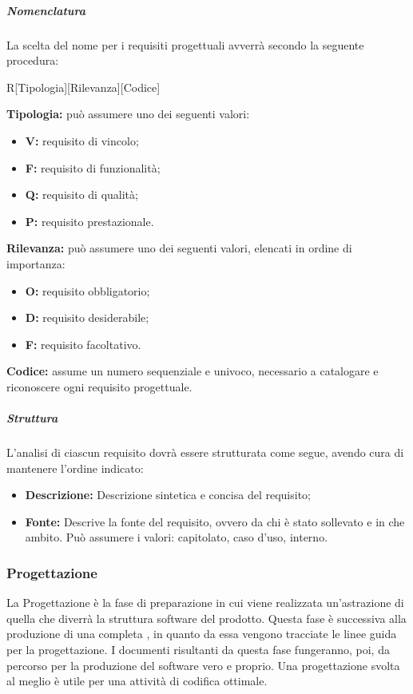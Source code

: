 			\subparagraph{Nomenclatura}
			La scelta del nome per i requisiti progettuali avverrà secondo la seguente procedura:
			\begin{center}
			R[Tipologia][Rilevanza][Codice]
			\end{center}
			\textbf{Tipologia:} può assumere uno dei seguenti valori:
			\begin{itemize}
				\item \textbf{V:} requisito di vincolo;
				\item \textbf{F:} requisito di funzionalità;
				\item \textbf{Q:} requisito di qualità;
				\item \textbf{P:} requisito prestazionale.
			\end{itemize}
			\textbf{Rilevanza:} può assumere uno dei seguenti valori, elencati in ordine di importanza:
			\begin{itemize}
				\item \textbf{O:} requisito obbligatorio;
				\item \textbf{D:} requisito desiderabile;
				\item \textbf{F:} requisito facoltativo.
			\end{itemize}
			\textbf{Codice:} assume un numero sequenziale e univoco, necessario a catalogare e riconoscere ogni requisito progettuale.
		
			\subparagraph{Struttura}
			L'analisi di ciascun requisito dovrà essere strutturata come segue, avendo cura di mantenere l'ordine indicato:
			\begin{itemize}
			  \item \textbf{Descrizione:} Descrizione sintetica e concisa del requisito;
			  \item \textbf{Fonte:} Descrive la fonte del requisito, ovvero da chi è stato sollevato e in che ambito. Può assumere i valori: capitolato, caso d'uso, interno.
			\end{itemize}
	
	\subsubsection{Progettazione}
	La Progettazione è la fase di preparazione in cui viene realizzata un'astrazione di quella che diverrà la struttura software del prodotto. Questa fase è successiva alla produzione di una completa \AdR, in quanto da essa vengono tracciate le linee guida per la progettazione. I documenti risultanti da questa fase fungeranno, poi, da percorso per la produzione del software vero e proprio. Una progettazione svolta al meglio è utile per una attività di codifica ottimale.
	
